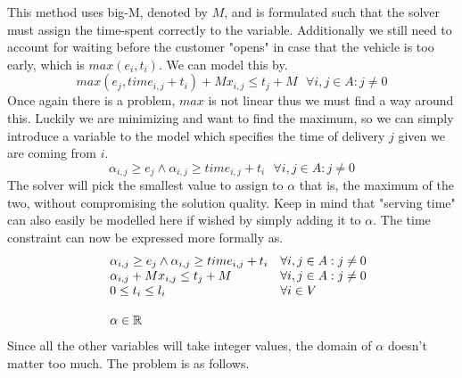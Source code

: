\documentclass{article}
\begin{document}
    This method uses big-M, denoted by $M$, and is formulated such that the solver must assign the time-spent correctly to the variable.
    Additionally we still need to account for waiting before the customer "opens" in case that the vehicle is too early, which is $max(e_i, t_i)$.
    We can model this by.
    \[
        max(e_j, time_{i,j} + t_i) + Mx_{i,j} \leq t_j + M \,\,\,\, \forall i,j \in A: j \neq 0
    \]
    Once again there is a problem, $max$ is not linear thus we must find a way around this.
    Luckily we are minimizing and want to find the maximum, so we can simply introduce a variable to the model which specifies the time of delivery $j$ given we are coming from $i$.
    \[
        \alpha_{i,j} \geq e_j \land \alpha_{i,j} \geq time_{i,j} + t_i \,\,\,\, \forall i,j \in A: j \neq 0
    \]
    The solver will pick the smallest value to assign to $\alpha$ that is, the maximum of the two, without compromising the solution quality.
    Keep in mind that "serving time" can also easily be modelled here if wished by simply adding it to $\alpha$.
    The time constraint can now be expressed more formally as.
    \begin{equation*}
        \begin{array}{ll@{}ll}
            & \displaystyle\alpha_{i,j} \geq e_j \land \alpha_{i,j} \geq time_{i,j} + t_i &&  \forall i,j \in A: j \neq 0\\
            & \displaystyle \alpha_{i,j} + Mx_{i,j} \leq t_j + M  && \forall i,j \in A: j \neq 0\\
            & \displaystyle0 \leq t_i \leq l_i &&  \forall i \in V\\\\
            & \displaystyle \alpha \in \mathbb{R} &&\\
        \end{array}
    \end{equation*}
    Since all the other variables will take integer values, the domain of $\alpha$ doesn't matter too much.
    The problem is as follows.
\end{document}
